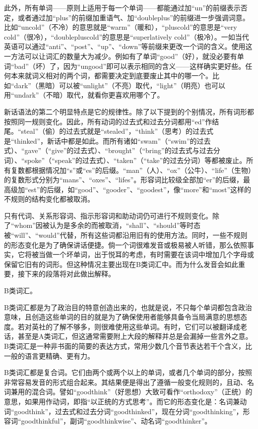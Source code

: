 此外，所有单词------原则上适用于每一个单词------都能通过加``un''的前缀表示否定，或者通过加``plus''的前缀加重语气、加``doubleplus''的前缀进一步强调词意。比如``uncold''（不冷）的意思就是``warm''（暖和），``pluscold''的意思是``very
cold''（很冷），``doublepluscold''的意思是``superlatively
cold''（极冷）。一如当代英语可以通过``anti''、``post''、``up''、``down''等前缀来更改一个词的含义。使用这一方法可以让词汇的数量大为减少。例如有了单词``good''（好），就没必要有单词``bad''（坏）了，因为``ungood''即可以表示相同的含义------这样确实更好些。任何本来就词义相对的两个词，都需要决定到底要废止其中的哪一个。比如``dark''（黑暗）可以被``unlight''（不亮）取代，``light''（明亮）也可以用``undark''（不暗）取代，就看你更喜欢用哪个了。

新话语法的第二个明显特点是它的规律性。除了以下提到的个别情况，所有词形都按照同一规则变化。因此，所有动词的过去式和过去分词都用``ed''作结尾。``steal''（偷）的过去式就是``stealed''，``think''（思考）的过去式是``thinked''，新话中都是如此。而所有诸如``swam''（``swim''的过去式）、``gave''（``give''的过去式）、``brought''（``bring''的过去式与过去分词）、``spoke''（``speak''的过去式）、``taken''（``take''的过去分词）等都被废止。所有复数都根据情况加``s''或``es''的后缀。``man''（人）、``ox''（公牛）、``life''（生物）的复数形式分别为``mans''、``oxes''、``lifes''。形容词比较级全部加``er''的后缀，最高级加``est''的后缀，如``good''、``gooder''、``goodest''，像``more''和``most''这样的不规则的结构变化都被取消。

只有代词、关系形容词、指示形容词和助动词仍可进行不规则变化。除了``whom''因被认为是多余的而被取消，``shall''、``should''等时态被``will''、``would''代替，所有这些词都沿用旧有的使用方法。同时，一些不规则的形态变化是为了确保讲话便捷。倘一个词很难发音或极易被人听错，那么依照事实，它将被当做一个坏单词，出于悦耳的考虑，有时需要在该词中增加几个字母或保留它旧有的词形。但这种情况主要出现在B类词汇中。而为什么发音会如此重要，接下来的段落将对此做出解释。

B类词汇。

B类词汇都是为了政治目的特意创造出来的，也就是说，不只每个单词都包含政治意味，且创造这些单词的目的就是为了确保使用者能够具备令当局满意的思想态度。若对英社的了解不够多，则很难使用这些单词。有时，它们可以被翻译成老话，甚至是A类词汇，但这通常需要附上大段的解释并总是会漏掉一些言外之意。B类词汇是一种非书面的简要的表达方式，常用少数几个音节表达若干个含义，比一般的语言更精确、更有力。

B类词汇都是复合词。它们由两个或两个以上的单词，或者几个单词的部分，按照非常容易发音的形式组合起来。其结果便是得出了遵循一般变化规则的，且动、名词兼用的混合词。譬如``goodthink''（好思想）大致可看作``orthodoxy''（正统）的意思，如果用作动词，即指``以正统的方式思考''。而它的形态变化是：名词兼动词``goodthink''，过去式和过去分词``goodthinked''，现在分词``goodthinking''，形容词``goodthinkful''，副词``goodthinkwise''、动名词``goodthinker''。

